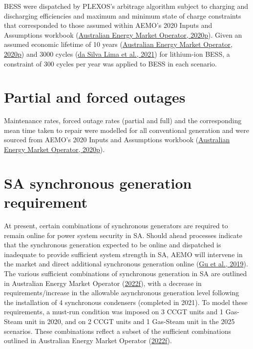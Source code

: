 \documentclass[12pt,a4paper,]{report}
\begin{document}
BESS were dispatched by PLEXOS's arbitrage algorithm subject to charging
and discharging efficiencies and maximum and minimum state of charge
constraints that corresponded to those assumed within AEMO's 2020 Inputs
and Assumptions workbook
(\protect\hyperlink{ref-australianenergymarketoperator2020InputsAssumptions2020}{Australian
Energy Market Operator, 2020p}). Given an assumed economic lifetime of
10 years
(\protect\hyperlink{ref-australianenergymarketoperator2020InputsAssumptions2020}{Australian
Energy Market Operator, 2020p}) and 3000 cycles
(\protect\hyperlink{ref-dasilvalimaLifeCycleAssessment2021}{da Silva
Lima et al., 2021}) for lithium-ion BESS, a constraint of 300 cycles per
year was applied to BESS in each scenario.

\hypertarget{partial-and-forced-outages}{%
\section{Partial and forced outages}\label{partial-and-forced-outages}}

Maintenance rates, forced outage rates (partial and full) and the
corresponding mean time taken to repair were modelled for all
conventional generation and were sourced from AEMO's 2020 Inputs and
Assumptions workbook
(\protect\hyperlink{ref-australianenergymarketoperator2020InputsAssumptions2020}{Australian
Energy Market Operator, 2020p}).

\hypertarget{sa-synchronous-generation-requirement}{%
\section{SA synchronous generation
requirement}\label{sa-synchronous-generation-requirement}}

At present, certain combinations of synchronous generators are required
to remain online for power system security in SA. Should ahead processes
indicate that the synchronous generation expected to be online and
dispatched is inadequate to provide sufficient system strength in SA,
AEMO will intervene in the market and direct additional synchronous
generation online (\protect\hyperlink{ref-guReviewSystemStrength2019}{Gu
et al., 2019}). The various sufficient combinations of synchronous
generation in SA are outlined in Australian Energy Market Operator
(\protect\hyperlink{ref-australianenergymarketoperatorTransferLimitAdvice2022}{2022f}),
with a decrease in requirements/increase in the allowable asynchronous
generation level following the installation of 4 synchronous condensers
(completed in 2021). To model these requirements, a must-run condition
was imposed on 3 CCGT units and 1 Gas-Steam unit in 2020, and on 2 CCGT
units and 1 Gas-Steam unit in the 2025 scenarios. These combinations
reflect a subset of the sufficient combinations outlined in Australian
Energy Market Operator
(\protect\hyperlink{ref-australianenergymarketoperatorTransferLimitAdvice2022}{2022f}).
\end{document}
